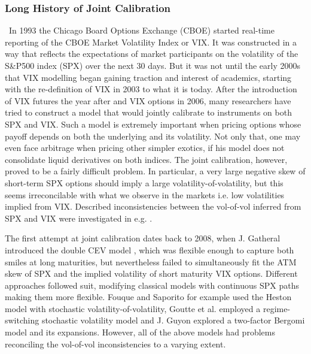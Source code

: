 \subsubsection{Long History of Joint Calibration}\
In 1993 the Chicago Board Options Exchange (CBOE) started real-time reporting of the CBOE Market Volatility Index or VIX. It was constructed in a way that reflects the expectations of market participants on the volatility of the S\&P500 index (SPX) over the next 30 days. But it was not until the early 2000s that VIX modelling began gaining traction and interest of academics, starting with the re-definition of VIX in 2003 to what it is today. After the introduction of VIX futures the year after and VIX options in 2006, many researchers have tried to construct a model that would jointly calibrate to instruments on both SPX and VIX. Such a model is extremely important when pricing options whose payoff depends on both the underlying and its volatility. Not only that, one may even face arbitrage when pricing other simpler exotics, if his model does not consolidate liquid derivatives on both indices. The joint calibration, however, proved to be a fairly difficult problem. In particular, a very large negative skew of short-term SPX options should imply a large volatility-of-volatility, but this seems irreconcilable with what we observe in the markets i.e. low volatilities implied from VIX. Described inconsistencies between the vol-of-vol inferred from SPX and VIX were investigated in e.g. \cite{Song2012APrices, Jacquier2021RoughOptions}.

The first attempt at joint calibration dates back to 2008, when J. Gatheral introduced the double CEV model \cite{Gatheral2008ConsistentOptions}, which was flexible enough to capture both smiles at long maturities, but nevertheless failed to simultaneously fit the ATM skew of SPX and the implied volatility of short maturity VIX options. Different approaches followed suit, modifying classical models with continuous SPX paths making them more flexible. %
Fouque and Saporito \cite{Fouque2018HestonOptions} for example used the Heston model with stochastic volatility-of-volatility, Goutte et al. \cite{Goutte2017Regime-switchingOptions} employed a regime-switching stochastic volatility model and J. Guyon \cite{Guyon2017OnOptions, Guyon2020TheSkew} explored a two-factor Bergomi model and its expansions. However, all of the above models had problems reconciling the vol-of-vol inconsistencies to a varying extent.

